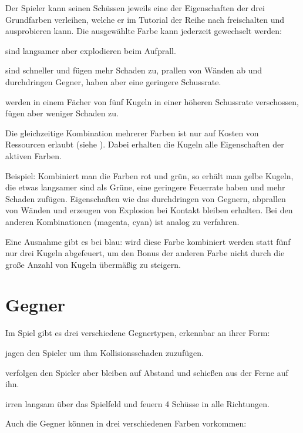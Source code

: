 Der Spieler kann seinen Schüssen jeweils eine der Eigenschaften der drei Grundfarben verleihen, welche er im Tutorial der Reihe nach freischalten und ausprobieren kann. Die ausgewählte Farbe kann jederzeit gewechselt werden:

\renewcommand{\imgspace}{3.5em}
\renewcommand{\itmspace}{4.5em}
{sind langsamer aber explodieren beim Aufprall.}

{sind schneller und fügen mehr Schaden zu, prallen von Wänden ab und durchdringen Gegner, haben aber eine geringere Schussrate.}

{werden in einem Fächer von fünf Kugeln in einer höheren Schussrate verschossen, fügen aber weniger Schaden zu.}

Die gleichzeitige Kombination mehrerer Farben ist nur auf Kosten von Ressourcen erlaubt (siehe ). Dabei erhalten die Kugeln alle Eigenschaften der aktiven Farben.

Beispiel: Kombiniert man die Farben rot und grün, so erhält man gelbe Kugeln, die etwas langsamer sind als Grüne, eine geringere Feuerrate haben und mehr Schaden zufügen. Eigenschaften wie das durchdringen von Gegnern, abprallen von Wänden und erzeugen von Explosion bei Kontakt bleiben erhalten. Bei den anderen Kombinationen (magenta, cyan) ist analog zu verfahren.

Eine Ausnahme gibt es bei blau: wird diese Farbe kombiniert werden statt fünf nur drei Kugeln abgefeuert, um den Bonus der anderen Farbe nicht durch die gro{\ss}e Anzahl von Kugeln übermä{\ss}ig zu steigern.


\section{Gegner}

Im Spiel gibt es drei verschiedene Gegnertypen, erkennbar an ihrer Form:

\renewcommand{\itmspace}{5em}
{jagen den Spieler um ihm Kollisionsschaden zuzufügen.}

{verfolgen den Spieler aber bleiben auf Abstand und schie{\ss}en aus der Ferne auf ihn.}

{irren langsam über das Spielfeld und feuern 4 Schüsse in alle Richtungen.}

Auch die Gegner können in drei verschiedenen Farben vorkommen:

